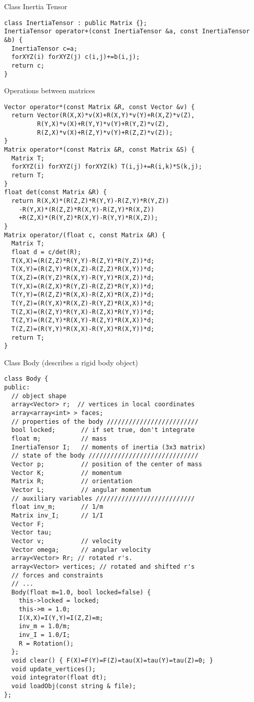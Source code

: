 Class Inertia Tensor
\begin{lstlisting}
class InertiaTensor : public Matrix {};
InertiaTensor operator+(const InertiaTensor &a, const InertiaTensor &b) {
  InertiaTensor c=a;
  forXYZ(i) forXYZ(j) c(i,j)+=b(i,j);
  return c;
}
\end{lstlisting}

Operations between matrices
\begin{lstlisting}
Vector operator*(const Matrix &R, const Vector &v) {
  return Vector(R(X,X)*v(X)+R(X,Y)*v(Y)+R(X,Z)*v(Z),
		 R(Y,X)*v(X)+R(Y,Y)*v(Y)+R(Y,Z)*v(Z),
		 R(Z,X)*v(X)+R(Z,Y)*v(Y)+R(Z,Z)*v(Z));
}
Matrix operator*(const Matrix &R, const Matrix &S) {
  Matrix T;
  forXYZ(i) forXYZ(j) forXYZ(k) T(i,j)+=R(i,k)*S(k,j);
  return T;
}
float det(const Matrix &R) {
  return R(X,X)*(R(Z,Z)*R(Y,Y)-R(Z,Y)*R(Y,Z))
    -R(Y,X)*(R(Z,Z)*R(X,Y)-R(Z,Y)*R(X,Z))
    +R(Z,X)*(R(Y,Z)*R(X,Y)-R(Y,Y)*R(X,Z));
}
Matrix operator/(float c, const Matrix &R) {
  Matrix T;
  float d = c/det(R);
  T(X,X)=(R(Z,Z)*R(Y,Y)-R(Z,Y)*R(Y,Z))*d;
  T(X,Y)=(R(Z,Y)*R(X,Z)-R(Z,Z)*R(X,Y))*d;
  T(X,Z)=(R(Y,Z)*R(X,Y)-R(Y,Y)*R(X,Z))*d;
  T(Y,X)=(R(Z,X)*R(Y,Z)-R(Z,Z)*R(Y,X))*d;
  T(Y,Y)=(R(Z,Z)*R(X,X)-R(Z,X)*R(X,Z))*d;
  T(Y,Z)=(R(Y,X)*R(X,Z)-R(Y,Z)*R(X,X))*d;
  T(Z,X)=(R(Z,Y)*R(Y,X)-R(Z,X)*R(Y,Y))*d;
  T(Z,Y)=(R(Z,Y)*R(X,Y)-R(Z,Y)*R(X,X))*d;
  T(Z,Z)=(R(Y,Y)*R(X,X)-R(Y,X)*R(X,Y))*d;
  return T;
}
\end{lstlisting}

Class Body (describes a rigid body object)
\begin{lstlisting}
class Body {
public:
  // object shape
  array<Vector> r;  // vertices in local coordinates
  array<array<int> > faces;
  // properties of the body /////////////////////////
  bool locked;       // if set true, don't integrate
  float m;           // mass
  InertiaTensor I;   // moments of inertia (3x3 matrix)
  // state of the body //////////////////////////////
  Vector p;          // position of the center of mass
  Vector K;          // momentum
  Matrix R;          // orientation
  Vector L;          // angular momentum
  // auxiliary variables ///////////////////////////
  float inv_m;       // 1/m
  Matrix inv_I;      // 1/I
  Vector F;
  Vector tau;
  Vector v;          // velocity
  Vector omega;      // angular velocity
  array<Vector> Rr; // rotated r's.
  array<Vector> vertices; // rotated and shifted r's
  // forces and constraints
  // ...
  Body(float m=1.0, bool locked=false) {
    this->locked = locked;
    this->m = 1.0;
    I(X,X)=I(Y,Y)=I(Z,Z)=m;
    inv_m = 1.0/m;
    inv_I = 1.0/I;
    R = Rotation();
  };
  void clear() { F(X)=F(Y)=F(Z)=tau(X)=tau(Y)=tau(Z)=0; }
  void update_vertices();
  void integrator(float dt);
  void loadObj(const string & file);
};
\end{lstlisting}

